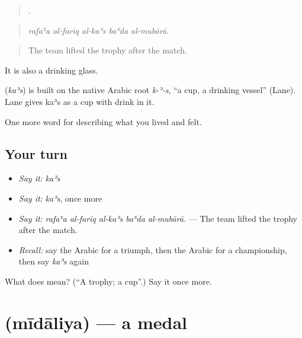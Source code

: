 \begin{quote}
    .
\end{quote}

\begin{quote}
\emph{rafaʿa al-farīq al-kaʾs baʿda al-mubārā.}
\end{quote}

\begin{quote}
The team lifted the trophy after the match.
\end{quote}

It is also a drinking glass.

\begin{cousinweb}
\textbf{} (\emph{kaʾs}) is built on the native Arabic root \emph{k-ʾ-s}, \textquotedblleft{}a cup, a drinking vessel\textquotedblright{} (Lane). Lane gives kaʾs as a cup with drink in it.
\end{cousinweb}

\begin{grammarlens}[title={What you've built}]
One more word for describing what you lived and felt.
\end{grammarlens}

\subsection*{Your turn}
\begin{itemize}
\raggedright
  \item \emph{Say it:} \emph{kaʾs}
  \item \emph{Say it:} \emph{kaʾs}, once more
  \item \emph{Say it:} \emph{rafaʿa al-farīq al-kaʾs baʿda al-mubārā.} — The team lifted the trophy after the match.
  \item \emph{Recall:} say the Arabic for a triumph, then the Arabic for a championship, then say \emph{kaʾs} again
\end{itemize}

\begin{tcolorbox}[breakable,colback=teal!4,colframe=teal!35!black,title={Before you move on}]
What does  mean? (\textquotedblleft{}A trophy; a cup\textquotedblright{}.) Say it once more.
\end{tcolorbox}
\section[\texorpdfstring{\ar{ميدالية} (mīdāliya)}{ميدالية (mīdāliya)}]{ (mīdāliya) — a medal}

